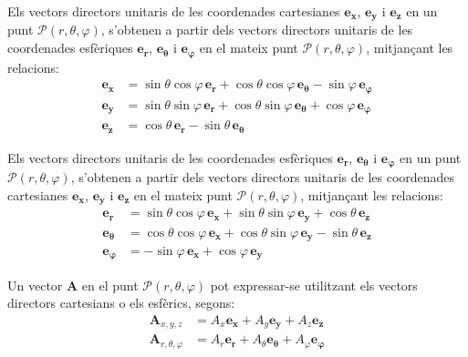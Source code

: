 \documentclass[catalan,a4paper,twoside,11pt]{article}
\begin{document}
Els vectors directors unitaris de les coordenades cartesianes  $\boldsymbol{e_x}$, $\boldsymbol{e_y}$ i $\boldsymbol{e_z}$ en un punt  $\mathscr{P}(r,\theta,\varphi)$, s'obtenen a partir dels vectors directors unitaris de les coordenades esfèriques $\boldsymbol{e_r}$, $\boldsymbol{e_\theta}$ i $\boldsymbol{e_\varphi}$ en el mateix punt $\mathscr{P}(r,\theta,\varphi)$, mitjançant les relacions:
\begin{subequations}\begin{align}
		\boldsymbol{e_x} &=\sin\theta\cos\varphi\,\boldsymbol{e_r}+
		\cos\theta\cos\varphi\,\boldsymbol{e_\theta}-\sin\varphi\,\boldsymbol{e_\varphi}\\
		\boldsymbol{e_y} &=\sin\theta\sin\varphi\,\boldsymbol{e_r}+
		\cos\theta\sin\varphi\,\boldsymbol{e_\theta}+\cos\varphi\,\boldsymbol{e_\varphi}\\
		\boldsymbol{e_z} &=\cos\theta\,\boldsymbol{e_r}-\sin\theta\,\boldsymbol{e_\theta}
\end{align}\end{subequations}


Els vectors directors unitaris de les coordenades esfèriques $\boldsymbol{e_r}$, $\boldsymbol{e_\theta}$ i $\boldsymbol{e_\varphi}$ en un punt $\mathscr{P}(r,\theta,\varphi)$, s'obtenen a partir dels vectors directors unitaris de les coordenades cartesianes $\boldsymbol{e_x}$, $\boldsymbol{e_y}$ i $\boldsymbol{e_z}$ en el mateix punt $\mathscr{P}(r,\theta,\varphi)$, mitjançant les relacions:
\begin{subequations}\begin{align}
    \boldsymbol{e_r} &=\sin\theta\cos\varphi\,\boldsymbol{e_x}+ \sin\theta\sin\varphi\,\boldsymbol{e_y}+\cos\theta\,\boldsymbol{e_z}\\
    \boldsymbol{e_\theta} &=\cos\theta\cos\varphi\,\boldsymbol{e_x}+
    \cos\theta\sin\varphi\,\boldsymbol{e_y}-\sin\theta\,\boldsymbol{e_z}\\
    \boldsymbol{e_\varphi}&=-\sin\varphi\,\boldsymbol{e_x}+\cos\varphi\,\boldsymbol{e_y}
\end{align}\end{subequations}

Un vector $\boldsymbol{A}$ en el punt $\mathscr{P}(r, \theta, \varphi)$  pot expressar-se utilitzant els vectors directors cartesians o els esfèrics, segons:
\begin{subequations}\begin{align}
		\boldsymbol{A}_{x,y,z} &= A_x \boldsymbol{e_x} + A_y \boldsymbol{e_y} + A_z \boldsymbol{e_z} \\
		\boldsymbol{A}_{r,\theta,\varphi} &= A_r  \boldsymbol{e_r} + A_\theta \boldsymbol{e_\theta} + A_\varphi \boldsymbol{e_\varphi}
\end{align}\end{subequations}
\end{document}
